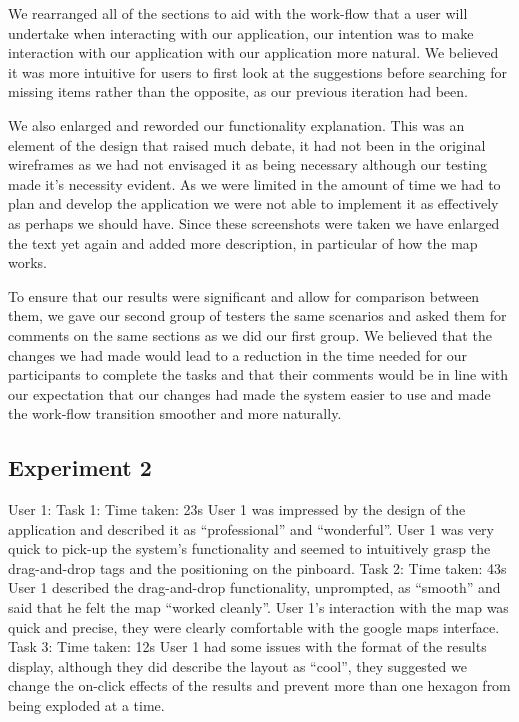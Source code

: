 \documentclass[10pt,a4paper]{article}
\begin{document}
We rearranged all of the sections to aid with the work-flow that a user will undertake when interacting with our application, our intention was to make interaction with our application with our application more natural. We believed it was more intuitive for users to first look at the suggestions before searching for missing items rather than the opposite, as our previous iteration had been.

We also enlarged and reworded our functionality explanation. This was an element of the design that raised much debate, it had not been in the original wireframes as we had not envisaged it as being necessary although our testing made it’s necessity evident. As we were limited in the amount of time we had to plan and develop the application we were not able to implement it as effectively as perhaps we should have. Since these screenshots were taken we have enlarged the text yet again and added more description, in particular of how the map works.

To ensure that our results were significant and allow for comparison between them, we gave our second group of testers the same scenarios and asked them for comments on the same sections as we did our first group. We believed that the changes we had made would lead to a reduction in the time needed for our participants to complete the tasks and that their comments would be in line with our expectation that our changes had made the system easier to use and made the work-flow transition smoother and more naturally.


\subsection*{Experiment 2}

User 1:
Task 1: 
Time taken: 23s
User 1 was impressed by the design of the application and described it as “professional” and “wonderful”.
User 1 was very quick to pick-up the system’s functionality and seemed to intuitively grasp the drag-and-drop tags and the positioning on the pinboard.
Task 2:
Time taken: 43s
User 1 described the drag-and-drop functionality, unprompted, as “smooth” and said that he felt the map “worked cleanly”.
User 1’s interaction with the map was quick and precise, they were clearly comfortable with the google maps interface. 
Task 3:
Time taken: 12s
User 1 had some issues with the format of the results display, although they did describe the layout as “cool”, they suggested we change the on-click effects of the results and prevent more than one hexagon from being exploded at a time.
\end{document}
